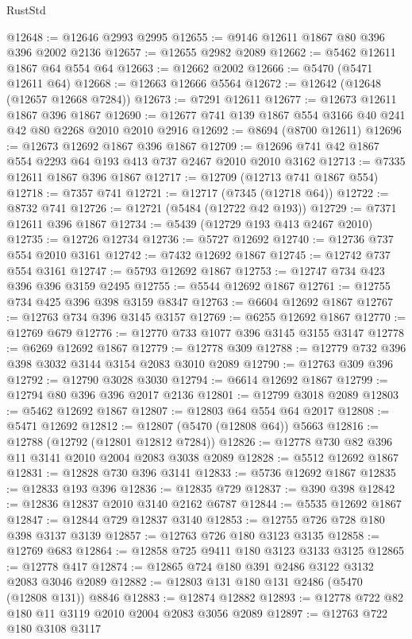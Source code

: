 \begin{lexlean}{RustStd}
\begin{coremodule}
@12648 := @12646 @2993 @2995
@12655 := @9146 @12611 @1867 @80 @396 @396 @2002 @2136
@12657 := @12655 @2982 @2089
@12662 := @5462 @12611 @1867 @64 @554 @64
@12663 := @12662 @2002
@12666 := @5470 (@5471 @12611 @64)
@12668 := @12663 @12666 @5564
@12672 := @12642 (@12648 (@12657 @12668 @7284))
@12673 := @7291 @12611
@12677 := @12673 @12611 @1867 @396 @1867
@12690 := @12677 @741 @139 @1867 @554 @3166 @40 @241 @42 @80 @2268 @2010 @2010 @2916
@12692 := @8694 (@8700 @12611)
@12696 := @12673 @12692 @1867 @396 @1867
@12709 := @12696 @741 @42 @1867 @554 @2293 @64 @193 @413 @737 @2467 @2010 @2010 @3162
@12713 := @7335 @12611 @1867 @396 @1867
@12717 := @12709 (@12713 @741 @1867 @554)
@12718 := @7357 @741
@12721 := @12717 (@7345 (@12718 @64))
@12722 := @8732 @741
@12726 := @12721 (@5484 (@12722 @42 @193))
@12729 := @7371 @12611 @396 @1867
@12734 := @5439 (@12729 @193 @413 @2467 @2010)
@12735 := @12726 @12734
@12736 := @5727 @12692
@12740 := @12736 @737 @554 @2010 @3161
@12742 := @7432 @12692 @1867
@12745 := @12742 @737 @554 @3161
@12747 := @5793 @12692 @1867
@12753 := @12747 @734 @423 @396 @396 @3159 @2495
@12755 := @5544 @12692 @1867
@12761 := @12755 @734 @425 @396 @398 @3159 @8347
@12763 := @6604 @12692 @1867
@12767 := @12763 @734 @396 @3145 @3157
@12769 := @6255 @12692 @1867
@12770 := @12769 @679
@12776 := @12770 @733 @1077 @396 @3145 @3155 @3147
@12778 := @6269 @12692 @1867
@12779 := @12778 @309
@12788 := @12779 @732 @396 @398 @3032 @3144 @3154 @2083 @3010 @2089
@12790 := @12763 @309 @396
@12792 := @12790 @3028 @3030
@12794 := @6614 @12692 @1867
@12799 := @12794 @80 @396 @396 @2017 @2136
@12801 := @12799 @3018 @2089
@12803 := @5462 @12692 @1867
@12807 := @12803 @64 @554 @64 @2017
@12808 := @5471 @12692
@12812 := @12807 (@5470 (@12808 @64)) @5663
@12816 := @12788 (@12792 (@12801 @12812 @7284))
@12826 := @12778 @730 @82 @396 @11 @3141 @2010 @2004 @2083 @3038 @2089
@12828 := @5512 @12692 @1867
@12831 := @12828 @730 @396 @3141
@12833 := @5736 @12692 @1867
@12835 := @12833 @193 @396
@12836 := @12835 @729
@12837 := @390 @398
@12842 := @12836 @12837 @2010 @3140 @2162 @6787
@12844 := @5535 @12692 @1867
@12847 := @12844 @729 @12837 @3140
@12853 := @12755 @726 @728 @180 @398 @3137 @3139
@12857 := @12763 @726 @180 @3123 @3135
@12858 := @12769 @683
@12864 := @12858 @725 @9411 @180 @3123 @3133 @3125
@12865 := @12778 @417
@12874 := @12865 @724 @180 @391 @2486 @3122 @3132 @2083 @3046 @2089
@12882 := @12803 @131 @180 @131 @2486 (@5470 (@12808 @131)) @8846
@12883 := @12874 @12882
@12893 := @12778 @722 @82 @180 @11 @3119 @2010 @2004 @2083 @3056 @2089
@12897 := @12763 @722 @180 @3108 @3117

\end{coremodule}
\end{lexlean}
